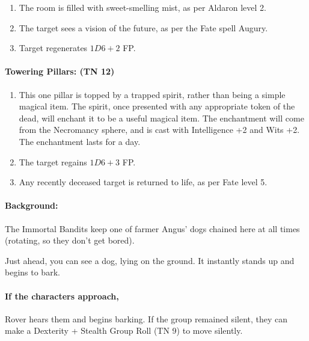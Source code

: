 \begin{multicols}{2}
\begin{enumerate}

  \item{The room is filled with sweet-smelling mist, as per Aldaron level 2.}
  \item{The target sees a vision of the future, as per the Fate spell Augury.}
  \item{Target regenerates $1D6+2$ FP.}
\end{enumerate}

\paragraph{Towering Pillars: (TN 12)}

\begin{enumerate}

  \item{This one pillar is topped by a trapped spirit, rather than being a simple magical item.  The spirit, once presented with any appropriate token of the dead, will enchant it to be a useful magical item.  The enchantment will come from the Necromancy sphere, and is cast with Intelligence +2 and Wits +2.  The enchantment lasts for a day.}
  \item{The target regains $1D6+3$ FP.}
  \item{Any recently deceased target is returned to life, as per Fate level 5.}

\end{enumerate}


\paragraph{Background:}
The Immortal Bandits keep one of farmer Angus' dogs chained here at all times (rotating, so they don't get bored).

\begin{boxtext}

  Just ahead, you can see a dog, lying on the ground.
  It instantly stands up and begins to bark.

\end{boxtext}

\paragraph{If the characters approach,}
Rover hears them and begins barking.
If the group remained silent, they can make a Dexterity + Stealth Group Roll (TN 9) to move silently.


\end{multicols}
